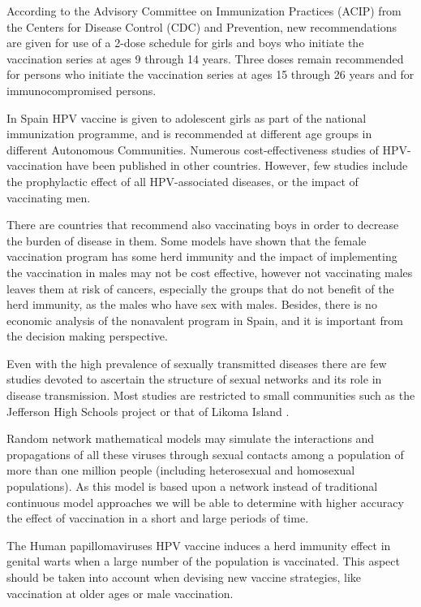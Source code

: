 According to the Advisory Committee on Immunization Practices (ACIP) from the Centers for Disease Control (CDC) and Prevention, new recommendations are given for use of a 2-dose schedule for girls and boys who initiate the vaccination series at ages 9 through 14 years. Three doses remain recommended for persons who initiate the vaccination series at ages 15 through 26 years and for immunocompromised persons.

In Spain HPV vaccine is given to adolescent girls as part of the national immunization programme, and is recommended at different age groups in different Autonomous Communities. Numerous cost-effectiveness studies of HPV-vaccination have been published in other countries. However, few studies include the prophylactic effect of all HPV-associated diseases, or the impact of vaccinating men.

There are countries that recommend also vaccinating boys in order to decrease the burden of disease in them. Some models have shown that the female vaccination program has some herd immunity and the impact of implementing the vaccination in males may not be cost effective, however not vaccinating males leaves them at risk of cancers, especially the groups that do not benefit of the herd immunity, as the males who have sex with males.
Besides, there is no economic analysis of the nonavalent program in Spain, and it is important from the decision making perspective.

Even with the high prevalence of sexually transmitted diseases there are few studies devoted to ascertain the structure of sexual networks and its role in disease transmission. Most studies are restricted to small communities such as the Jefferson High Schools project \cite{bearman2004chains} or that of Likoma Island \cite{helleringer2007sexual}.

Random network mathematical models may simulate the interactions and propagations of all these viruses through sexual contacts among a population of more than one million people (including heterosexual and homosexual populations). As this model is based upon a network instead of traditional continuous model approaches \cite{elbasha2007model} we will be able to determine with higher accuracy the effect of vaccination in a short and large periods of time.

The Human papillomaviruses HPV vaccine induces a herd immunity effect in genital warts when a large number of the population is vaccinated. This aspect should be taken into account when devising new vaccine strategies, like vaccination at older ages or male vaccination. 

